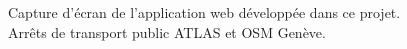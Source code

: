 \thispagestyle{empty}
\vspace*{500pt} %
\begin{flushleft}
Capture d'écran de l'application web développée dans ce projet.\\
Arrêts de transport public ATLAS et OSM Genève.
\end{flushleft}